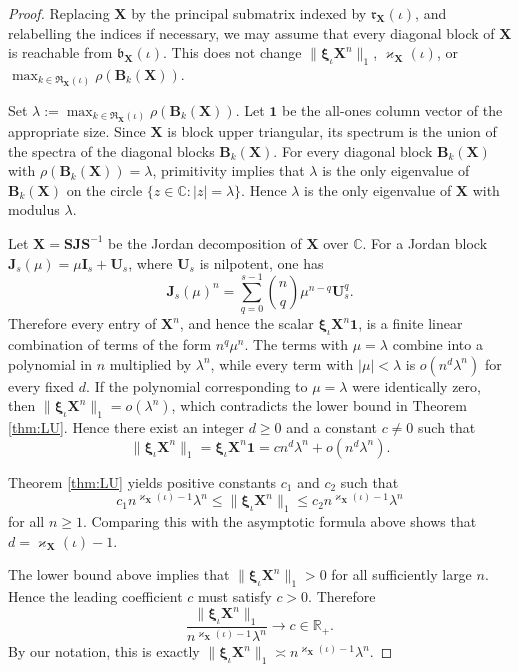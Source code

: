 \documentclass[12pt]{iopart}
\newcommand*{\bbbxi}{\boldsymbol{\xi}}
\begin{document}
\begin{proof}
Replacing $\mathbf X$ by the principal submatrix indexed by $\mathfrak r_{\mathbf X}(\iota)$, and relabelling the indices if necessary, we may assume that every diagonal block of $\mathbf X$ is reachable from $\mathfrak b_{\mathbf X}(\iota)$.
This does not change $\|\bbbxi_\iota \mathbf X^n\|_1$, $\varkappa_{\mathbf X}(\iota)$, or $\max_{k\in \mathfrak R_{\mathbf X}(\iota)} \rho(\mathbf B_k(\mathbf X))$.

Set
$
\lambda := \max_{k\in \mathfrak R_{\mathbf X}(\iota)} \rho(\mathbf B_k(\mathbf X)).
$
Let $\mathbf{1}$ be the all-ones column vector of the appropriate size.
Since $\mathbf X$ is block upper triangular, its spectrum is the union of the spectra of the diagonal blocks $\mathbf B_k(\mathbf X)$.
For every diagonal block $\mathbf B_k(\mathbf X)$ with $\rho(\mathbf B_k(\mathbf X)) = \lambda$, primitivity implies that $\lambda$ is the only eigenvalue of $\mathbf B_k(\mathbf X)$ on the circle $\{ z \in \mathbb{C} : |z| = \lambda \}$.
Hence $\lambda$ is the only eigenvalue of $\mathbf X$ with modulus $\lambda$.

Let $\mathbf X = \mathbf S \mathbf J \mathbf S^{-1}$ be the Jordan decomposition of $\mathbf X$ over $\mathbb{C}$.
For a Jordan block $\mathbf J_s(\mu) = \mu \mathbf I_s + \mathbf U_s$, where $\mathbf U_s$ is nilpotent, one has
\[
\mathbf J_s(\mu)^n = \sum_{q=0}^{s-1} \binom{n}{q} \mu^{n-q} \mathbf U_s^q.
\]
Therefore every entry of $\mathbf X^n$, and hence the scalar $\bbbxi_\iota \mathbf X^n \mathbf{1}$, is a finite linear combination of terms of the form $n^q \mu^n$.
The terms with $\mu = \lambda$ combine into a polynomial in $n$ multiplied by $\lambda^n$, while every term with $|\mu| < \lambda$ is $o(n^d \lambda^n)$ for every fixed $d$.
If the polynomial corresponding to $\mu = \lambda$ were identically zero, then $\|\bbbxi_\iota \mathbf X^n\|_1 = o(\lambda^n)$, which contradicts the lower bound in Theorem \ref{thm:LU}.
Hence there exist an integer $d \ge 0$ and a constant $c \neq 0$ such that
\[
\|\bbbxi_\iota \mathbf X^n\|_1 = \bbbxi_\iota \mathbf X^n \mathbf{1} = c n^d \lambda^n + o(n^d \lambda^n).
\]


Theorem \ref{thm:LU} yields positive constants $c_1$ and $c_2$ such that
\[
c_1 n^{\varkappa_{\mathbf X}(\iota)-1} \lambda^n
\le
\|\bbbxi_\iota \mathbf X^n\|_1
\le
c_2 n^{\varkappa_{\mathbf X}(\iota)-1} \lambda^n
\]
for all $n \ge 1$.
Comparing this with the asymptotic formula above shows that
$
d = \varkappa_{\mathbf X}(\iota) - 1.
$

The lower bound above implies that $\|\bbbxi_\iota \mathbf X^n\|_1 > 0$ for all sufficiently large $n$.
Hence the leading coefficient $c$ must satisfy $c > 0$.
Therefore
\[
\frac{\|\bbbxi_\iota \mathbf X^n\|_1}{n^{\varkappa_{\mathbf X}(\iota)-1} \lambda^n} \to c \in \mathbb{R}_+.
\]
By our notation, this is exactly
$
\|\bbbxi_\iota \mathbf X^n\|_1 \asymp n^{\varkappa_{\mathbf X}(\iota)-1} \lambda^n.
$
\end{proof}
\end{document}
